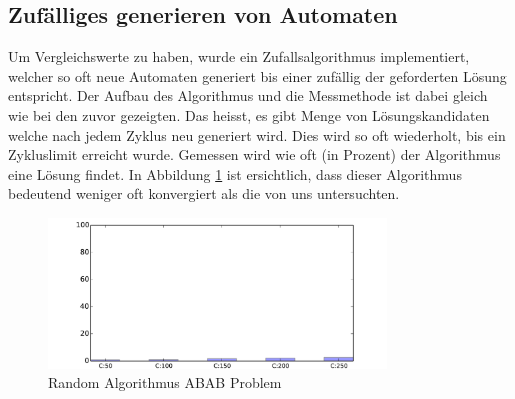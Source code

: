 \subsection{Zufälliges generieren von Automaten}
Um Vergleichswerte zu haben, wurde ein Zufallsalgorithmus implementiert, welcher so oft neue Automaten generiert bis einer zufällig der geforderten Lösung entspricht. Der Aufbau des Algorithmus und die Messmethode ist dabei gleich wie bei den zuvor gezeigten. Das heisst, es gibt Menge von Lösungskandidaten welche nach jedem Zyklus neu generiert wird. Dies wird so oft wiederholt, bis ein Zykluslimit erreicht wurde. Gemessen wird wie oft (in Prozent) der Algorithmus eine Lösung findet. In Abbildung \ref{fig:rand_abab} ist ersichtlich, dass dieser Algorithmus bedeutend weniger oft konvergiert als die von uns untersuchten.

\begin{figure}[h]
  \centering
  \includegraphics[width=0.80\textwidth]{images/RAND_ABAB_RAND_solved.pdf}
  \caption[Random Algorithmus ABAB Problem]{Random Algorithmus ABAB Problem}
  \label{fig:rand_abab}
\end{figure}